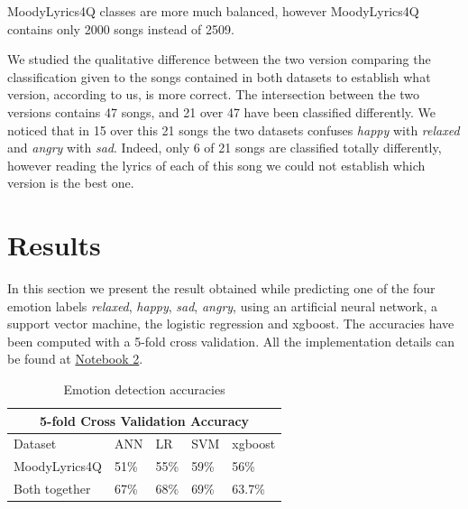 MoodyLyrics4Q classes are more much balanced, however MoodyLyrics4Q contains only 2000 songs instead of 2509. \par
We studied the qualitative difference between the two version comparing the classification given to the songs contained in both datasets to establish what version, according to us, is more correct. The intersection between the two versions contains 47 songs, and 21 over 47 have been classified differently. We noticed that in 15 over this 21 songs the two datasets confuses \textit{happy} with \textit{relaxed} and \textit{angry} with \textit{sad}. Indeed, only 6 of 21 songs are classified totally differently, however reading the lyrics of each of this song we could not establish which version is the best one.



\section{Results}
In this section we present the result obtained while predicting one of the four emotion labels \textit{relaxed}, \textit{happy}, \textit{sad}, \textit{angry}, using an artificial neural network, a support vector machine, the logistic regression and xgboost. The accuracies have been computed with a 5-fold cross validation. All the implementation details can be found at \href{https://github.com/sgiammy/emotion-patterns-in-music-playlists/blob/master/Notebook/2_Advanced_Feature_Engineering.ipynb}{Notebook 2}.

\begin{table}[H]
\begin{tabular}{ |p{3cm}||p{1.5cm}|p{1.5cm}|p{1.5cm}|p{1.5cm}|  }
 \hline
 \multicolumn{5}{|c|}{5-fold Cross Validation Accuracy} \\
 \hline
 Dataset & ANN & LR &SVM & xgboost\\
 \hline
MoodyLyrics4Q  & 51\%    &55\% &  59\% & 56\%\\
Both together &   67\%  & 68\%   &69\% &63.7\%\\
\hline
\end{tabular}
\caption{Emotion detection accuracies} \label{tab:comparison}
\end{table}

